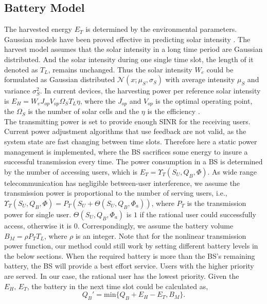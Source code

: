 \documentclass[conference]{IEEEtran}
\begin{document}
\subsection{Battery Model}
The harvested energy \(E_T\) is determined by the environmental parameters.
Gaussian models have been proved effective in predicting solar intensity \cite{gaussian,data}.
The harvest model assumes that the solar intensity in a long time period are Gaussian distributed.
And the solar intensity during one single time slot, the length of it denoted as \(T_L\), remains unchanged.
Thus the solar intensity \(W_e\) could be formulated as
Gaussian distributed \(\mathcal{N}\left(x;\mu_S,\sigma_S\right)\) 
with average intensity \(\mu_S\) and variance \(\sigma_S^2\).
In current devices, 
the harvesting power per reference solar intensity is 
\(E_H = W_eJ_{op}V_{op}\Omega_ST_L\eta\), where the \(J_{op}\) and \(V_{op}\) is the optimal operating point,
the \(\Omega_S\) is the number of solar cells and the \(\eta\) is the efficiency \cite{physic}.\\
\indent The transmitting power is set to provide enough SINR for the receiving users.
Current power adjustment algorithms that use feedback are not valid,
as the system state are fast changing between time slots.
Therefore here a static power management is implemented, 
where the BS sacrifices some energy to insure a successful transmission every time.
The power consumption in a BS is determined by the number of accessing users,
which is \(E_T = \Upsilon_T(S_U, Q_B, \Phi)\).
As wide range telecommunication has negligible between-user interference,
we assume the transmission power is proportional to the number of serving users, i.e.,
\(\Upsilon_T(S_U, Q_B, \Phi) = P_T(S_U + \Theta(S_U,Q_B,\Phi_a))\), where \(P_T\) is the transmission power for single user. 
\(\Theta(S_U,Q_B,\Phi_a)\) is \(1\) if the rational user could successfully access, otherwise it is \(0\).
Correspondingly, we assume the battery volume \(B_M = \rho P_TT_L\), where \(\rho\) is an integer.
Note that for the nonlinear transmission power function,
our method could still work by setting different battery levels in the below sections.
When the required battery is more than the BS's remaining battery,
the BS will provide a best effort service. 
Users with the higher priority are served.
In our case, the rational user has the lowest priority.
Given the \(E_H,\,E_T\), the battery in the next time slot could be calculated as,
\begin{equation}
	Q_B' = \mbox{min}\{Q_B + E_H - E_T, B_M\}.
\end{equation}
\end{document}
